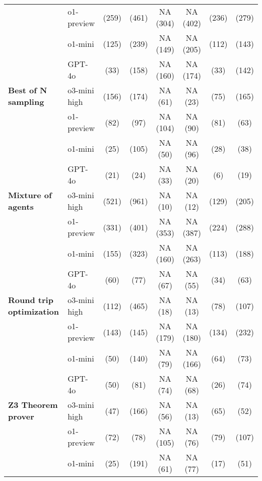 \begin{table}[H]
\begin{tabular}{llcccccc}
& o1-preview & \X (259) & \C (461) & NA (304) & NA (402) & \X (236) & \X (279) \\
& o1-mini & \X (125) & \C (239) & NA (149) & NA (205) & \X (112) & \X (143) \\
& GPT-4o & \X (33) & \C (158) & NA (160) & NA (174) & \X (33) & \C (142) \\
\midrule
\textbf{Best of N sampling} 
& o3-mini high & \C (156) & \X (174) & NA (61) & NA (23) & \X (75) & \C (165) \\
& o1-preview & \X (82) & \C (97) & NA (104) & NA (90) & \X (81) & \X (63) \\
& o1-mini & \C (25) & \X (105) & NA (50) & NA (96) & \X (28) & \X (38) \\
& GPT-4o & \X (21) & \X (24) & NA (33) & NA (20) & \X (6) & \X (19) \\
\midrule
\textbf{Mixture of agents} 
& o3-mini high & \C (521) & \C (961) & NA (10) & NA (12) & \X (129) & \X (205) \\
& o1-preview & \C (331) & \X (401) & NA (353) & NA (387) & \X (224) & \X (288) \\
& o1-mini & \C (155) & \X (323) & NA (160) & NA (263) & \X (113) & \X (188) \\
& GPT-4o & \X (60) & \C (77) & NA (67) & NA (55) & \X (34) & \X (63) \\
\midrule
\textbf{Round trip optimization} 
& o3-mini high & \C (112) & \X(465) & NA (18) & NA (13) & \X (78) & \X (107) \\
& o1-preview & \X (143) & \X (145) & NA (179) & NA (180) & \X (134) & \X (232) \\
& o1-mini & \C (50) & \X (140) & NA (79) & NA (166) & \X (64) & \X (73) \\
& GPT-4o & \X (50) & \C (81) & NA (74) & NA (68) & \X (26) & \X (74) \\
\midrule
\textbf{Z3 Theorem prover} & o3-mini high & \X (47) & \X (166) & NA (56)  & NA (13) & \X (65) & \C (52) \\
& o1-preview & \X (72) & \C (78) & NA (105) & NA (76) & \X (79) & \X (107) \\
& o1-mini & \C (25) & \X (191) & NA (61) & NA (77) & \X (17) & \X (51) \\

\end{tabular}
\end{table}

